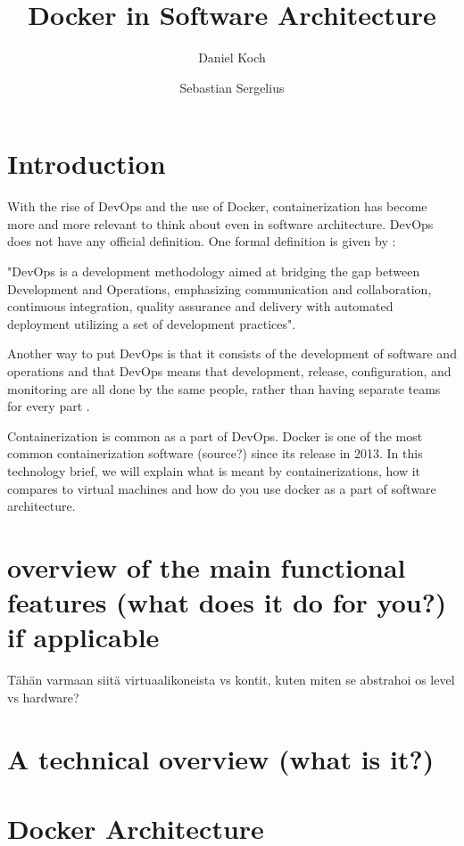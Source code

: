 \documentclass[fleqn,12pt]{olplainarticle}
\title{Docker in Software Architecture}
\author[1]{Daniel Koch}
\author[2]{Sebastian Sergelius}
\affil[1]{daniel.koch@helsinki.fi}
\affil[2]{github.com/sebazai}
\begin{document}
\flushbottom
\maketitle
\thispagestyle{empty}

\section{Introduction}

With the rise of DevOps and the use of Docker, containerization has become more and more relevant to think about even
in software architecture. DevOps does not have any official definition.
One formal definition is given by \cite{Jabbari_devops}: 
\begin{displayquote}
"DevOps is a development methodology aimed at bridging the gap between Development and Operations, emphasizing communication and collaboration, continuous integration, quality assurance and delivery with automated deployment utilizing a set of development practices".
\end{displayquote}
Another way to put DevOps is that it consists of the development of software and operations and that DevOps means that development, release, configuration, and monitoring are all done by the same people, rather than having separate teams for every part \citep{hy:DevOps_with_Docker}.

Containerization is common as a part of DevOps. Docker is one of the most common containerization software (source?) since its release in 2013. In this technology brief, we will explain what is meant by containerizations, how it compares to virtual machines and how do you use docker as a part of software architecture.


\section{overview of the main functional features (what does it do for you?) if applicable}

Tähän varmaan siitä virtuaalikoneista vs kontit, kuten miten se abstrahoi os level vs hardware?

\section{A technical overview (what is it?)}

\section{Docker Architecture}
\end{document}

